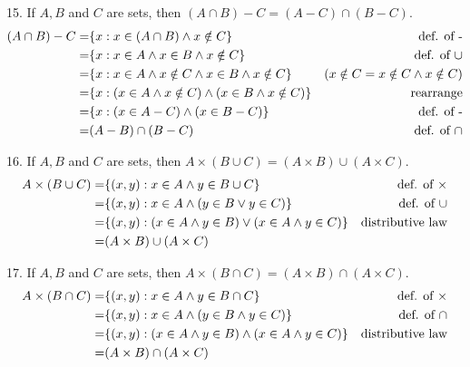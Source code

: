 \documentclass[openany, 12pt]{book}
\begin{document}
\begin{exercise}{}{}
	{15. If $A, B$ and $C$ are sets, then $(A \cap B)-C=(A-C) \cap(B-C)$.}
	\begin{align*}
		(A\cap B) - C = & \{x: x\in (A\cap B) \land x\notin C\}                          & \text{def. of -}                         \\
		=               & \{x: x\in A \land x \in B \land x\notin C\}                    & \text{def. of $\cup$}                    \\
		=               & \{x: x\in A \land x\notin C \land x\in B \land x\notin C\}     & (x\notin C = x\notin C \land x \notin C) \\
		=               & \{x: (x\in A \land x\notin C) \land (x\in B \land x\notin C)\} & \text{rearrange}                         \\
		=               & \{x: (x\in A  - C) \land (x\in B - C)\}                        & \text{def. of -}                         \\
		=               & (A - B) \cap (B-C)                                               & \text{def. of }\cap
	\end{align*}
\end{exercise}

\begin{exercise}{}{}
	{16. If $A, B$ and $C$ are sets, then $A \times(B \cup C)=(A \times B) \cup(A \times C)$.}
	\begin{align*}
		A\times (B\cup C) = & \{(x, y): x\in A \land y\in B\cup C\}                        & \text{def. of }\times \\
		=                   & \{(x,y): x\in A \land (y \in B \lor y\in C)\}                & \text{def. of $\cup$} \\
		=                   & \{(x,y): (x\in A \land y \in B) \lor (x\in A \land y\in C)\} &
		\text{distributive law}                                                                                      \\
		=                   & (A\times B) \cup (A\times C)
	\end{align*}
\end{exercise}

\begin{exercise}{}{}
	{17. If $A, B$ and $C$ are sets, then $A \times(B \cap C)=(A \times B) \cap(A \times C)$.}
	\begin{align*}
		A\times (B\cap C) = & \{(x, y): x\in A \land y\in B\cap C\}                         & \text{def. of }\times \\
		=                   & \{(x,y): x\in A \land (y \in B \land y\in C)\}                & \text{def. of $\cap$} \\
		=                   & \{(x,y): (x\in A \land y \in B) \land (x\in A \land y\in C)\} &
		\text{distributive law}                                                                                       \\
		=                   & (A\times B) \cap (A\times C)
	\end{align*}
\end{exercise}
\end{document}
